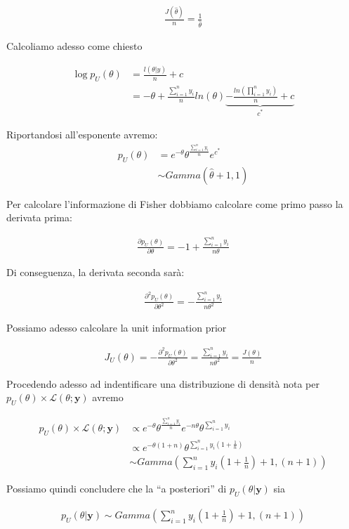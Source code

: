 \begin{align*}
\frac{J(\hat{\theta})}{n} = \frac{1}{\hat{\theta}}
\end{align*}

Calcoliamo adesso come chiesto 

\begin{align*}
\log p_U(\theta) &= \frac{l(\theta|y)}{n}+c\\
 &= -\theta + \frac{\sum_{i=1}^n y_i}{n} ln(\theta) \underbrace{ -\frac{ln(\prod_{i=1}^n y_i)}{n} + c }_\text{$c^*$}
\end{align*}

Riportandosi all'esponente avremo:
\begin{align*}
p_U(\theta) &= e^{-\theta}\theta^{\frac{\sum_{i=1}^n y_i}{n}}e^{c^*}\\
&\sim Gamma(\hat{\theta}+1,1)
\end{align*}

Per calcolare l'informazione di Fisher dobbiamo calcolare come primo passo la derivata prima:

\begin{align*}
\frac{\partial p_U(\theta)}{\partial\theta} = -1 + \frac{\sum_{i=1}^n y_i}{n\theta}
\end{align*}

Di conseguenza, la derivata seconda sarà:

\begin{align*}
\frac{\partial^2 p_U(\theta)}{\partial\theta^2} = - \frac{\sum_{i=1}^n y_i}{n\theta^2}
\end{align*}

Possiamo adesso calcolare la unit information prior

\begin{align*}
J_U(\theta)= - \frac{\partial^2 p_U(\theta)}{\partial\theta^2} = \frac{\sum_{i=1}^n y_i}{n\theta^2} = \frac{J(\theta)}{n}
\end{align*}

Procedendo adesso ad indentificare una distribuzione di densità nota per $  p_U(\theta) \times \mathcal{L}(\theta;\textbf{y}) $ avremo 

\begin{align*}
p_U(\theta) \times \mathcal{L}(\theta;\textbf{y}) &\propto e^{-\theta} \theta  ^ {\frac{\sum_{i=1}^n y_i}{n}} e^{-n\theta}\theta^{\sum_{i=1}^n y_i}\\
&\propto e^{-\theta(1+n)}\theta^{\sum_{i=1}^n y_i (1+\frac{1}{n})}\\
&\sim Gamma\left(\sum_{i=1}^n y_i\left(1 + \frac{1}{n}\right) + 1, (n+1)\right)
\end{align*}

Possiamo quindi concludere che la ``a posteriori'' di $p_U(\theta|\textbf{y})$ sia

\begin{align*}
p_U(\theta|\textbf{y}) \sim Gamma\left(\sum_{i=1}^n y_i\left(1 + \frac{1}{n}\right) + 1, (n+1)\right)
\end{align*}
